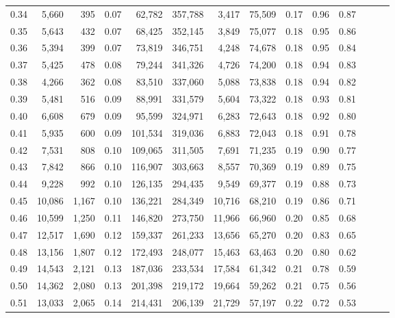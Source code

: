 \begin{tabular}{rrrrrrrrrrrrrr}
0.34 &   5,660 &    395 &  0.07 &   62,782 &  357,788 &   3,417 &  75,509 &  0.17 &  0.96 &      0.87 \\
0.35 &   5,643 &    432 &  0.07 &   68,425 &  352,145 &   3,849 &  75,077 &  0.18 &  0.95 &      0.86 \\
0.36 &   5,394 &    399 &  0.07 &   73,819 &  346,751 &   4,248 &  74,678 &  0.18 &  0.95 &      0.84 \\
0.37 &   5,425 &    478 &  0.08 &   79,244 &  341,326 &   4,726 &  74,200 &  0.18 &  0.94 &      0.83 \\
0.38 &   4,266 &    362 &  0.08 &   83,510 &  337,060 &   5,088 &  73,838 &  0.18 &  0.94 &      0.82 \\
0.39 &   5,481 &    516 &  0.09 &   88,991 &  331,579 &   5,604 &  73,322 &  0.18 &  0.93 &      0.81 \\
0.40 &   6,608 &    679 &  0.09 &   95,599 &  324,971 &   6,283 &  72,643 &  0.18 &  0.92 &      0.80 \\
0.41 &   5,935 &    600 &  0.09 &  101,534 &  319,036 &   6,883 &  72,043 &  0.18 &  0.91 &      0.78 \\
0.42 &   7,531 &    808 &  0.10 &  109,065 &  311,505 &   7,691 &  71,235 &  0.19 &  0.90 &      0.77 \\
0.43 &   7,842 &    866 &  0.10 &  116,907 &  303,663 &   8,557 &  70,369 &  0.19 &  0.89 &      0.75 \\
0.44 &   9,228 &    992 &  0.10 &  126,135 &  294,435 &   9,549 &  69,377 &  0.19 &  0.88 &      0.73 \\
0.45 &  10,086 &  1,167 &  0.10 &  136,221 &  284,349 &  10,716 &  68,210 &  0.19 &  0.86 &      0.71 \\
0.46 &  10,599 &  1,250 &  0.11 &  146,820 &  273,750 &  11,966 &  66,960 &  0.20 &  0.85 &      0.68 \\
0.47 &  12,517 &  1,690 &  0.12 &  159,337 &  261,233 &  13,656 &  65,270 &  0.20 &  0.83 &      0.65 \\
0.48 &  13,156 &  1,807 &  0.12 &  172,493 &  248,077 &  15,463 &  63,463 &  0.20 &  0.80 &      0.62 \\
0.49 &  14,543 &  2,121 &  0.13 &  187,036 &  233,534 &  17,584 &  61,342 &  0.21 &  0.78 &      0.59 \\
0.50 &  14,362 &  2,080 &  0.13 &  201,398 &  219,172 &  19,664 &  59,262 &  0.21 &  0.75 &      0.56 \\
0.51 &  13,033 &  2,065 &  0.14 &  214,431 &  206,139 &  21,729 &  57,197 &  0.22 &  0.72 &      0.53 \\

\end{tabular}
